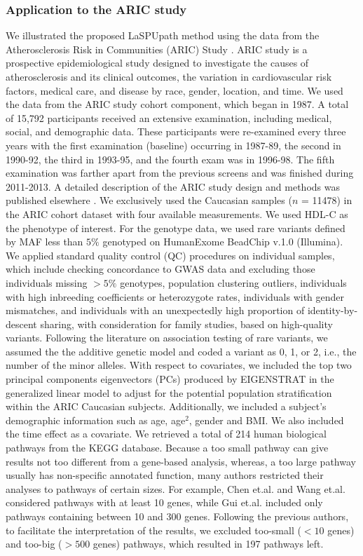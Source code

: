 \documentclass[12pt]{article}
\begin{document}
\subsubsection{Application to the ARIC study}
We illustrated the proposed LaSPUpath method using the data from the Atherosclerosis Risk in Communities (ARIC) Study \cite{Heiss1989}.  ARIC study is a prospective epidemiological study designed to investigate the causes of atherosclerosis and its clinical outcomes, the variation in cardiovascular risk factors, medical care, and disease by race, gender, location, and time. We used the data from the ARIC study cohort component, which began in 1987. A total of 15,792 participants received an extensive examination, including medical, social, and demographic data. These participants were re-examined every three years with the first examination (baseline) occurring in 1987-89, the second in 1990-92, the third in 1993-95, and the fourth exam was in 1996-98. The fifth examination was farther apart from the previous screens and was finished during 2011-2013. A detailed description of the ARIC study design and methods was published elsewhere \cite{Investigators1989}. We exclusively used the Caucasian samples ($n$ = 11478) in the ARIC cohort dataset with four available measurements. We used HDL-C as the phenotype of interest. For the genotype data, we used rare variants defined by MAF less than $5\%$ genotyped on HumanExome BeadChip v.1.0 (Illumina).\cite{Grove2013} We applied standard quality control (QC) procedures on individual samples, which include checking concordance to GWAS data and excluding those individuals missing $>5\%$ genotypes, population clustering outliers, individuals with high inbreeding coefficients or heterozygote rates, individuals with gender mismatches, and individuals with an unexpectedly high proportion of identity-by-descent sharing, with consideration for family studies, based on high-quality variants. Following the literature on association testing of rare variants, we assumed the the additive genetic model and coded a variant as 0, 1, or 2, i.e., the number of the minor alleles. With respect to covariates, we included the top two principal components eigenvectors (PCs) produced by EIGENSTRAT \cite{Price2006} in the generalized linear model to adjust for the potential population stratification within the ARIC Caucasian subjects. Additionally, we included a subject's demographic information such as age, age$^2$, gender and BMI. We also included the time effect as a covariate. We retrieved a total of 214 human biological pathways from the KEGG database.\cite{Ogata1999} Because a too small pathway can give results not too different from a gene-based analysis, whereas, a too large pathway usually has non-specific annotated function, many authors restricted their analyses to pathways of certain sizes. For example, Chen et.al.\cite{Chen2010} and Wang et.al.\cite{Wang2010} considered pathways with at least 10 genes, while Gui et.al.\cite{Gui2011} included only pathways containing between 10 and 300 genes. Following the previous authors, to facilitate the interpretation of the results, we excluded too-small ($<10$ genes) and too-big ($>500$ genes) pathways, which resulted in 197 pathways left. %
\end{document}

